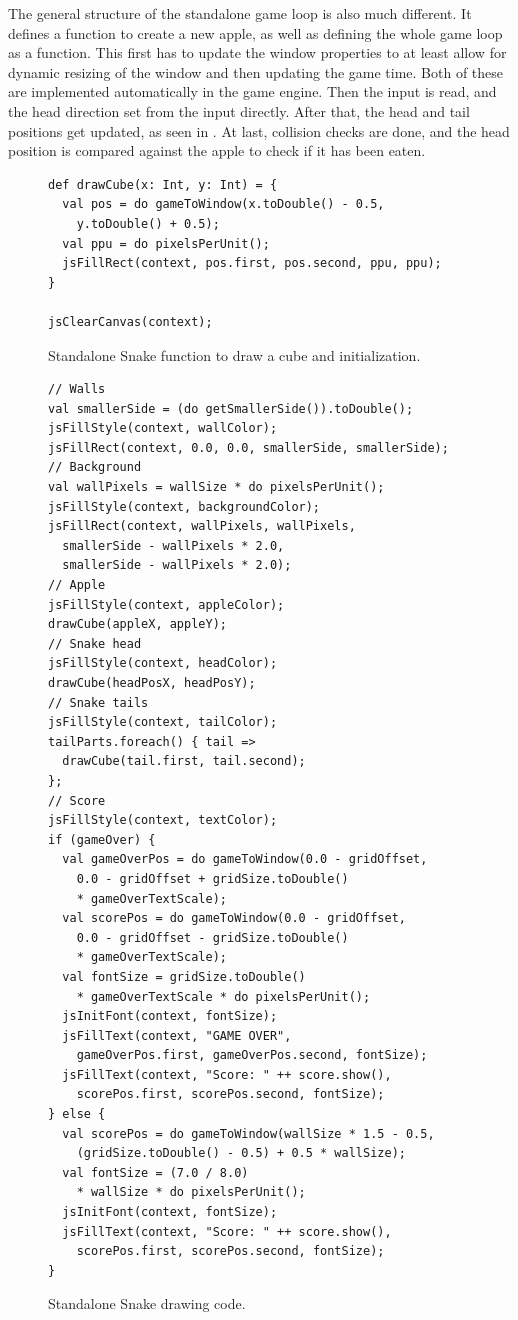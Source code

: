 The general structure of the standalone game loop is also much different. It defines a function to create a new apple, as well as defining the whole game loop as a function. This first has to update the window properties to at least allow for dynamic resizing of the window and then updating the game time. Both of these are implemented automatically in the game engine. Then the input is read, and the head direction set from the input directly. After that, the head and tail positions get updated, as seen in . At last, collision checks are done, and the head position is compared against the apple to check if it has been eaten.

\begin{figure}[h!]
\begin{lstlisting}
def drawCube(x: Int, y: Int) = {
  val pos = do gameToWindow(x.toDouble() - 0.5,
    y.toDouble() + 0.5);
  val ppu = do pixelsPerUnit();
  jsFillRect(context, pos.first, pos.second, ppu, ppu);
}

jsClearCanvas(context);
\end{lstlisting}
\caption{Standalone Snake function to draw a cube and initialization.}
\label{fig:casestandalonedrawinit}
\end{figure}

\begin{figure}[h!]
\begin{lstlisting}
// Walls
val smallerSide = (do getSmallerSide()).toDouble();
jsFillStyle(context, wallColor);
jsFillRect(context, 0.0, 0.0, smallerSide, smallerSide);
// Background
val wallPixels = wallSize * do pixelsPerUnit();
jsFillStyle(context, backgroundColor);
jsFillRect(context, wallPixels, wallPixels,
  smallerSide - wallPixels * 2.0,
  smallerSide - wallPixels * 2.0);
// Apple
jsFillStyle(context, appleColor);
drawCube(appleX, appleY);
// Snake head
jsFillStyle(context, headColor);
drawCube(headPosX, headPosY);
// Snake tails
jsFillStyle(context, tailColor);
tailParts.foreach() { tail =>
  drawCube(tail.first, tail.second);
};
// Score
jsFillStyle(context, textColor);
if (gameOver) {
  val gameOverPos = do gameToWindow(0.0 - gridOffset,
    0.0 - gridOffset + gridSize.toDouble()
    * gameOverTextScale);
  val scorePos = do gameToWindow(0.0 - gridOffset,
    0.0 - gridOffset - gridSize.toDouble()
    * gameOverTextScale);
  val fontSize = gridSize.toDouble()
    * gameOverTextScale * do pixelsPerUnit();
  jsInitFont(context, fontSize);
  jsFillText(context, "GAME OVER",
    gameOverPos.first, gameOverPos.second, fontSize);
  jsFillText(context, "Score: " ++ score.show(),
    scorePos.first, scorePos.second, fontSize);
} else {
  val scorePos = do gameToWindow(wallSize * 1.5 - 0.5,
    (gridSize.toDouble() - 0.5) + 0.5 * wallSize);
  val fontSize = (7.0 / 8.0)
    * wallSize * do pixelsPerUnit();
  jsInitFont(context, fontSize);
  jsFillText(context, "Score: " ++ score.show(),
    scorePos.first, scorePos.second, fontSize);
}
\end{lstlisting}
\caption{Standalone Snake drawing code.}
\label{fig:casestandalonedraw}
\end{figure}


